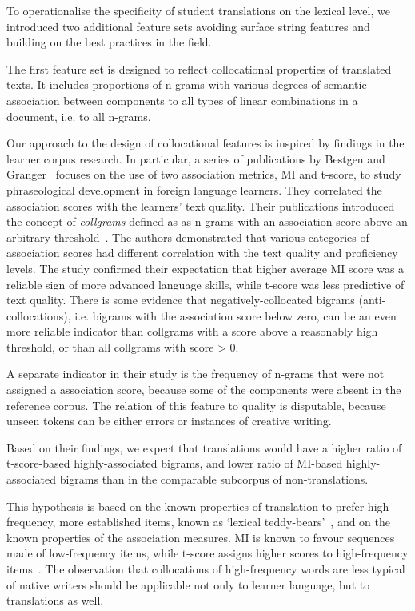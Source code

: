 To operationalise the specificity of student translations on the lexical level, we introduced two additional feature sets avoiding surface string features and building on the best practices in the field.  

The first feature set is designed to reflect collocational properties of translated texts. It includes proportions of n-grams with various degrees of semantic association between components to all types of linear combinations in a document, i.e. to all n-grams. 

Our approach to the design of collocational features is inspired by findings in the learner corpus research. In particular, a series of publications by Bestgen and Granger~\cite{Bestgen2014,Bestgen2017,Granger2017} focuses on the use of two association metrics, \gls{MI} and t-score, to study phraseological development in foreign language learners. They correlated the association scores with the learners' text quality. Their publications introduced the concept of \textit{collgrams} defined as as n-grams with an association score above an arbitrary threshold~\cite{Bestgen2014}. The authors demonstrated that various categories of association scores had different correlation with the text quality and proficiency levels. The study confirmed their expectation that higher average MI score was a reliable sign of more advanced language skills, while t-score was less predictive of text quality. 
There is some evidence that negatively-collocated bigrams (anti-collocations), i.e. bigrams with the association score below zero, can be an even more reliable indicator than collgrams with a score above a reasonably high threshold, or than all collgrams with score > 0. 

A separate indicator in their study is the frequency of n-grams that were not assigned a association score, because some of the components were absent in the reference corpus. The relation of this feature to quality is disputable, because unseen tokens can be either errors or instances of creative writing. 

\label{pg:why_collocations}
Based on their findings, we expect that translations would have a higher ratio of t-score-based highly-associated bigrams, and lower ratio of MI-based highly-associated bigrams than in the comparable subcorpus of non-translations.
 
This hypothesis is based on the known properties of translation to prefer high-frequency, more established items, known as `lexical teddy-bears'~\cite[p.123]{Johansson2008}, and on the known properties of the association measures. MI is known to favour sequences made of low-frequency items, while t-score assigns higher scores to high-frequency items~\cite{Gries2010}. The observation that collocations of high-frequency words are less typical of native writers should be applicable not only to learner language, but to translations as well. 

